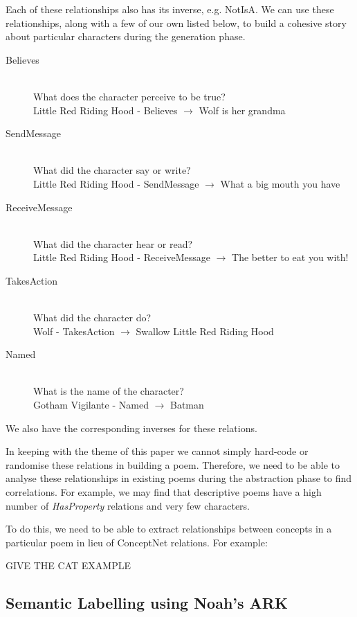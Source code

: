 Each of these relationships also has its inverse, e.g. NotIsA. We can use these relationships, along with a few of our own listed below, to build a cohesive story about particular characters during the generation phase.

\begin{description}
\item[Believes] \hfill \\ What does the character perceive to be true? \hfill \\ Little Red Riding Hood - Believes $\rightarrow$ Wolf is her grandma
\item[SendMessage] \hfill \\ What did the character say or write?  \hfill \\ Little Red Riding Hood - SendMessage $\rightarrow$ What a big mouth you have
\item[ReceiveMessage] \hfill \\ What did the character hear or read?  \hfill \\ Little Red Riding Hood - ReceiveMessage $\rightarrow$ The better to eat you with!
\item[TakesAction] \hfill \\ What did the character do?  \hfill \\ Wolf - TakesAction $\rightarrow$ Swallow Little Red Riding Hood
\item[Named] \hfill \\ What is the name of the character? \hfill \\ Gotham Vigilante - Named $\rightarrow$ Batman
\end{description}

We also have the corresponding inverses for these relations. 

In keeping with the theme of this paper we cannot simply hard-code or randomise these relations in building a poem. Therefore, we need to be able to analyse these relationships in existing poems during the abstraction phase to find correlations. For example, we may find that descriptive poems have a high number of \textit{HasProperty} relations and very few characters.  

To do this, we need to be able to extract relationships between concepts in a particular poem in lieu of ConceptNet relations. For example:

GIVE THE CAT EXAMPLE

\subsection{Semantic Labelling using Noah's ARK}

